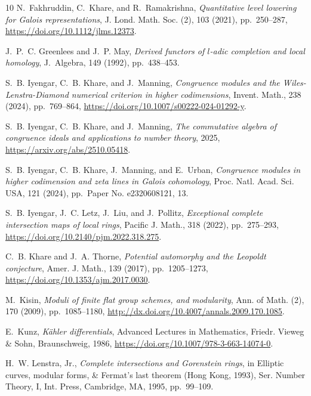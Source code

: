 \documentclass[twoside,leqno]{article}
\begin{document}
\begin{thebibliography}{10}
{\sc N.~Fakhruddin, C.~Khare, and R.~Ramakrishna}, {\em Quantitative level
  lowering for {G}alois representations}, J. Lond. Math. Soc. (2), 103 (2021),
  pp.~250--287, \url{https://doi.org/10.1112/jlms.12373}.

{\sc J.~P.~C. Greenlees and J.~P. May}, {\em {Derived functors of $l$-adic
  completion and local homology}}, J.~Algebra, 149 (1992), pp.~438--453.

{\sc S.~B. Iyengar, C.~B. Khare, and J.~Manning}, {\em Congruence modules and
  the {W}iles-{L}enstra-{D}iamond numerical criterion in higher codimensions},
  Invent. Math., 238 (2024), pp.~769--864, \url{https://doi.org/10.1007/s00222-024-01292-y}.

{\sc S.~B. Iyengar, C.~B. Khare, and J.~Manning}, {\em The commutative algebra
  of congruence ideals and applications to number theory}, 2025, \url{https://arxiv.org/abs/2510.05418}.

{\sc S.~B. Iyengar, C.~B. Khare, J.~Manning, and E.~Urban}, {\em Congruence
  modules in higher codimension and zeta lines in {G}alois cohomology}, Proc.
  Natl. Acad. Sci. USA, 121 (2024), pp.~Paper No. e2320608121, 13.

{\sc S.~B. Iyengar, J.~C. Letz, J.~Liu, and J.~Pollitz}, {\em Exceptional
  complete intersection maps of local rings}, Pacific J. Math., 318 (2022),
  pp.~275--293,   \url{https://doi.org/10.2140/pjm.2022.318.275}.

{\sc C.~B. Khare and J.~A. Thorne}, {\em Potential automorphy and the
  {L}eopoldt conjecture}, Amer. J. Math., 139 (2017), pp.~1205--1273,
 \url{https://doi.org/10.1353/ajm.2017.0030}.

{\sc M.~Kisin}, {\em Moduli of finite flat group schemes, and modularity}, Ann.
  of Math. (2), 170 (2009), pp.~1085--1180,
  \url{http://dx.doi.org/10.4007/annals.2009.170.1085}.

{\sc E.~Kunz}, {\em K\"ahler differentials}, Advanced Lectures in Mathematics,
  Friedr. Vieweg \& Sohn, Braunschweig, 1986,
  \url{https://doi.org/10.1007/978-3-663-14074-0}.

{\sc H.~W. Lenstra, Jr.}, {\em Complete intersections and {G}orenstein rings},
  in Elliptic curves, modular forms, \& {F}ermat's last theorem ({H}ong {K}ong,
  1993), Ser. Number Theory, I, Int. Press, Cambridge, MA, 1995, pp.~99--109.


\end{thebibliography}
\end{document}

